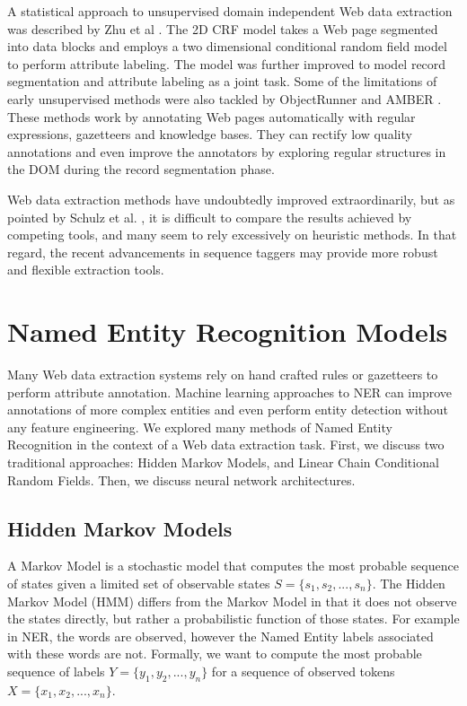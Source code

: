\documentclass{nle}
\begin{document}
A statistical approach to unsupervised domain 
independent Web data extraction was described by Zhu et al . The 2D CRF 
model takes a Web page segmented into data blocks and employs a two dimensional conditional 
random field model to perform attribute labeling. The model was further improved
\cite{Zhu2006} to model record segmentation and attribute labeling as a joint task.
Some of the limitations of early unsupervised methods 
were also tackled by ObjectRunner \cite{Abdessalem2010} and AMBER \cite{Furche2012}. 
These methods work by annotating Web pages automatically with regular expressions, gazetteers and 
knowledge bases. They can rectify low quality annotations and even improve the annotators
by exploring regular structures in the DOM during the record segmentation phase.

Web data extraction methods have undoubtedly improved extraordinarily, but
as pointed by Schulz et al. , it is difficult to compare the results 
achieved by competing tools, and many seem to rely excessively on heuristic methods.
In that regard, the recent advancements in sequence taggers may provide more robust and
flexible extraction tools.

\section{Named Entity Recognition Models}

Many Web data extraction systems rely on hand crafted rules or gazetteers to perform
attribute annotation. Machine learning approaches to NER can improve annotations of 
more complex entities and even perform entity detection without any feature
engineering. We explored many methods of Named Entity Recognition
in the context of a Web data extraction task. First, we discuss two traditional 
approaches: Hidden Markov Models, and Linear Chain Conditional Random Fields. Then,
we discuss neural network architectures.

\subsection{Hidden Markov Models}

A Markov Model is a stochastic model that computes the most probable sequence of states 
given a limited set of observable states $ S = \{s_1, s_2, ..., s_n \} $.
The Hidden Markov Model (HMM) differs from the Markov Model in that it
does not observe the states directly, but rather a probabilistic function of those 
states. For example in NER, the words are observed, however the Named Entity labels
associated with these words are not. Formally, we want to compute the most probable
sequence of labels $ Y = \{y_1, y_2, ..., y_n\} $ for a sequence of observed tokens
$ X = \{x_1, x_2, ..., x_n\} $.
\end{document}
